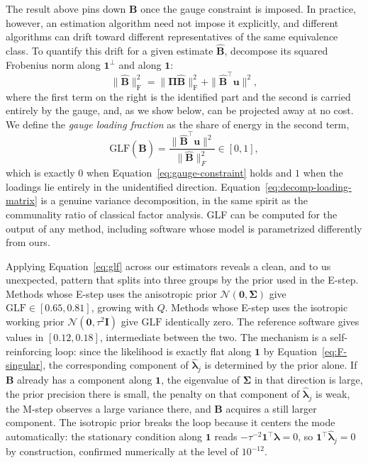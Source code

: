 The result above pins down $\mathbf{B}$ once the gauge constraint is imposed. In practice, however, an estimation algorithm need not impose it explicitly, and different algorithms can drift toward different representatives of the same equivalence class. To quantify this drift for a given estimate $\hat{\mathbf{B}}$, decompose its squared Frobenius norm along $\mathbf{1}^\perp$ and along $\mathbf{1}$:
\begin{equation}
    \|\hat{\mathbf{B}}\|^{2}_{\mathrm{F}}=\|\bm{\Pi}\hat{\mathbf{B}}\|^{2}_{\mathrm{F}}+\|\hat{\mathbf{B}}^{\top}\mathbf{u}\|^{2},
    \label{eq:decomp-loading-matrix}
\end{equation}
where the first term on the right is the identified part and the second is carried entirely by the gauge, and, as we show below, can be projected away at no cost. We define the \emph{gauge loading fraction} as the share of energy in the second term,
\begin{equation}
\mathrm{GLF}(\hat{\mathbf{B}})=\frac{\lVert\hat{\mathbf{B}}^\top\mathbf{u}\rVert^2}{\lVert\hat{\mathbf{B}}\rVert_F^2}\in[0,1],
\label{eq:glf}
\end{equation}
which is exactly $0$ when Equation~\eqref{eq:gauge-constraint} holds and $1$ when the loadings lie entirely in the unidentified direction. Equation~\eqref{eq:decomp-loading-matrix} is a genuine variance decomposition, in the same spirit as the communality ratio of classical factor analysis. GLF can be computed for the output of any method, including software whose model is parametrized differently from ours.
 
Applying Equation~\eqref{eq:glf} across our estimators reveals a clean, and to us unexpected, pattern that splits into three groups by the prior used in the E-step. Methods whose E-step uses the anisotropic prior $\mathcal{N}(\mathbf{0},\bm{\Sigma})$ give $\mathrm{GLF}\in[0.65,0.81]$, growing with $Q$. Methods whose E-step uses the isotropic working prior $\mathcal{N}(\mathbf{0},\tau^2\mathbf{I})$ give $\mathrm{GLF}$ identically zero. The reference software gives values in $[0.12,0.18]$, intermediate between the two. The mechanism is a self-reinforcing loop: since the likelihood is exactly flat along $\mathbf{1}$ by Equation~\eqref{eq:F-singular}, the corresponding component of $\hat{\bm{\lambda}}_j$ is determined by the prior alone. If $\mathbf{B}$ already has a component along $\mathbf{1}$, the eigenvalue of $\bm{\Sigma}$ in that direction is large, the prior precision there is small, the penalty on that component of $\hat{\bm{\lambda}}_j$ is weak, the M-step observes a large variance there, and $\mathbf{B}$ acquires a still larger component. The isotropic prior breaks the loop because it centers the mode automatically: the stationary condition along $\mathbf{1}$ reads $-\tau^{-2}\mathbf{1}^\top\bm{\lambda}=0$, so $\mathbf{1}^\top\hat{\bm{\lambda}}_j=0$ by construction, confirmed numerically at the level of $10^{-12}$.
 
